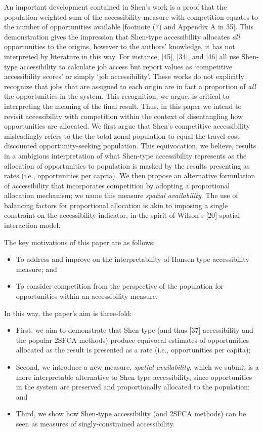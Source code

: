 \documentclass[10pt,letterpaper]{article}
\begin{document}
An important development contained in Shen's work is a proof that the
population-weighted sum of the accessibility measure with competition
equates to the number of opportunities available {[}footnote (7) and
Appendix A in 35{]}. This demonstration gives the impression that
Shen-type accessibility allocates \emph{all} opportunities to the
origins, however to the authors' knowledge, it has not interpreted by
literature in this way. For instance, {[}45{]}, {[}34{]}, and {[}46{]}
all use Shen-type accessibility to calculate job access but report
values as `competitive accessibility scores' or simply `job
accessibility'. These works do not explicitly recognize that jobs that
are assigned to each origin are in fact a proportion of \emph{all} the
opportunities in the system. This recognition, we argue, is critical to
interpreting the meaning of the final result. Thus, in this paper we
intend to revisit accessibility with competition within the context of
disentangling how opportunities are allocated. We first argue that
Shen's competitive accessibility misleadingly refers to the the total
zonal population to equal the travel-cost discounted opportunity-seeking
population. This equivocation, we believe, results in a ambigious
interpretation of what Shen-type accessibility represents as the
allocation of opportunities to population is masked by the results
presenting as rates (i.e., opportunities per capita). We then propose an
alternative formulation of accessibility that incorporates competition
by adopting a proportional allocation mechanism; we name this measure
\emph{spatial availability}. The use of balancing factors for
proportional allocation is akin to imposing a single constraint on the
accessibility indicator, in the spirit of Wilson's {[}20{]} spatial
interaction model.

The key motivations of this paper are as follows:

\begin{itemize}
\item
  To address and improve on the interpretability of Hansen-type
  accessibility measure; and
\item
  To consider competition from the perspective of the population for
  opportunities within an accessibility measure.
\end{itemize}

In this way, the paper's aim is three-fold:

\begin{itemize}
\item
  First, we aim to demonstrate that Shen-type (and thus {[}37{]}
  accessibility and the popular 2SFCA methods) produce equivocal
  estimates of opportunities allocated as the result is presented as a
  rate (i.e., opportunities per capita);
\item
  Second, we introduce a new measure, \emph{spatial availability}, which
  we submit is a more interpretable alternative to Shen-type
  accessibility, since opportunities in the system are preserved and
  proportionally allocated to the population; and
\item
  Third, we show how Shen-type accessibility (and 2SFCA methods) can be
  seen as measures of singly-constrained accessibility.
\end{itemize}
\end{document}
